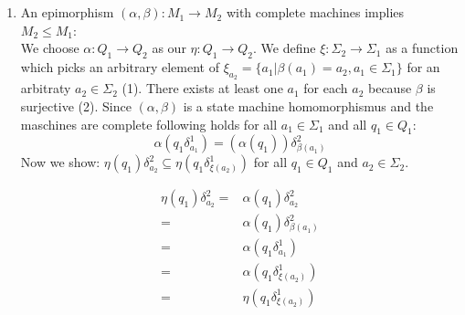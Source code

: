 \documentclass[a4paper,12pt,numbers=noenddot]{scrreport}
\begin{document}

\chapter{}
\section{}
\begin{enumerate}
    \item An epimorphism $(\alpha, \beta): M_1 \rightarrow M_2$ with complete machines implies $M_2 \leq M_1$: \\
We choose $\alpha : Q_1 \rightarrow Q_2$ as our $\eta: Q_1 \rightarrow Q_2$.
We define $\xi: \Sigma_2 \rightarrow \Sigma_1$ as a function which picks an arbitrary element of $\xi_{a_2} = \{a_1 | \beta(a_1) = a_2, a_1 \in \Sigma_1\}$ for an arbitraty $a_2 \in \Sigma_2$ (1).
There exists at least one $a_1$ for each $a_2$ because $\beta$ is surjective (2).
Since $(\alpha,\beta)$ is a state machine homomorphismus and the maschines are complete following holds for all $a_1 \in \Sigma_1$ and all $q_1 \in Q_1$:
$$
\alpha(q_1\delta^1_{a_1}) = (\alpha(q_1))\delta^2_{\beta(a_1)}
$$ 
Now we show: $\eta(q_1)\delta^2_{a_2} \subseteq \eta(q_1\delta^1_{\xi(a_2)})$ for all $q_1 \in Q_1$ and $a_2 \in \Sigma_2$.

\begin{align*}
    \eta(q_1)\delta^2_{a_2} = & \alpha(q_1)\delta^2_{a_2} \\
                 = & \alpha(q_1)\delta^2_{\beta(a_1)} \label{eq1}\tag{2} \\
                 = & \alpha(q_1\delta^1_{a_1}) \\
                 = & \alpha(q_1\delta^1_{\xi(a_2)})\label{eq2}\tag{1} \\
                 = & \eta(q_1\delta^1_{\xi(a_2)})
\end{align*}
\end{enumerate}
\end{document}
